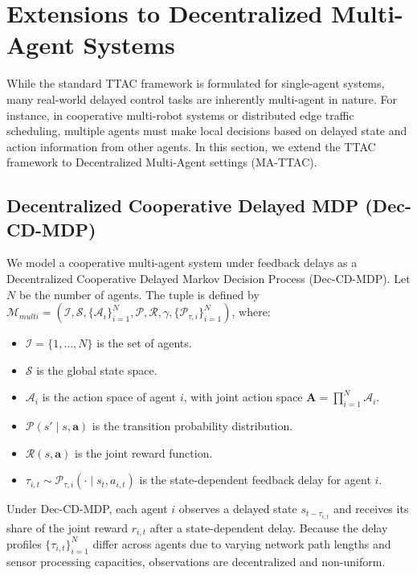 \documentclass[manuscript, screen, review]{jair}
\begin{document}
\section{Extensions to Decentralized Multi-Agent Systems}
While the standard TTAC framework is formulated for single-agent systems, many real-world delayed control tasks are inherently multi-agent in nature. For instance, in cooperative multi-robot systems or distributed edge traffic scheduling, multiple agents must make local decisions based on delayed state and action information from other agents. In this section, we extend the TTAC framework to Decentralized Multi-Agent settings (MA-TTAC).

\subsection{Decentralized Cooperative Delayed MDP (Dec-CD-MDP)}
We model a cooperative multi-agent system under feedback delays as a Decentralized Cooperative Delayed Markov Decision Process (Dec-CD-MDP). Let $N$ be the number of agents. The tuple is defined by $\mathcal{M}_{multi} = (\mathcal{I}, \mathcal{S}, \{\mathcal{A}_i\}_{i=1}^N, \mathcal{P}, \mathcal{R}, \gamma, \{\mathcal{P}_{\tau, i}\}_{i=1}^N)$, where:
\begin{itemize}
    \item $\mathcal{I} = \{1, \dots, N\}$ is the set of agents.
    \item $\mathcal{S}$ is the global state space.
    \item $\mathcal{A}_i$ is the action space of agent $i$, with joint action space $\mathbf{A} = \prod_{i=1}^N \mathcal{A}_i$.
    \item $\mathcal{P}(s' \mid s, \mathbf{a})$ is the transition probability distribution.
    \item $\mathcal{R}(s, \mathbf{a})$ is the joint reward function.
    \item $\tau_{i, t} \sim \mathcal{P}_{\tau, i}(\cdot \mid s_t, a_{i, t})$ is the state-dependent feedback delay for agent $i$.
\end{itemize}
Under Dec-CD-MDP, each agent $i$ observes a delayed state $s_{t-\tau_{i, t}}$ and receives its share of the joint reward $r_{i, t}$ after a state-dependent delay. Because the delay profiles $\{\tau_{i, t}\}_{i=1}^N$ differ across agents due to varying network path lengths and sensor processing capacities, observations are decentralized and non-uniform.
\end{document}
